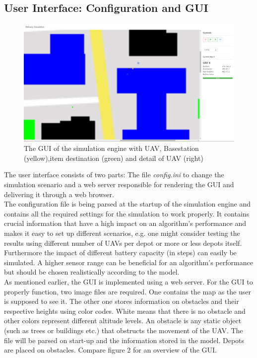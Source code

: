 \subsection{User Interface: Configuration and GUI}
\begin{figure}[htbp]\label{fig:gui}
	\centering
	\includegraphics[width=\textwidth]{images/gui}
	\caption{The GUI of the simulation engine with UAV, Basestation (yellow),item destination (green) and detail of UAV (right)}
\end{figure}
The user interface consists of two parts: The file \textit{config.ini} to change the simulation scenario and a web server responsible for rendering the GUI and delivering it through a web browser.\\
The configuration file is being parsed at the startup of the simulation engine and contains all the required settings for the simulation to work properly. It contains crucial information that have a high impact on an algorithm's performance and makes it easy to set up different scenarios, e.g. one might consider testing the results using different number of UAVs per depot or more or less depots itself.
Furthermore the impact of different battery capacity (in steps) can easily be simulated. A higher sensor range can be beneficial for an algorithm's performance but should be chosen realistically according to the model.\\
As mentioned earlier, the GUI is implemented using a web server. For the GUI to properly function, two image files are required. One contains the map as the user is supposed to see it. The other one stores information on obstacles and their respective heights using color codes. White means that there is no obstacle and other colors represent different altitude levels. An obstacle is any static object (such as trees or buildings etc.) that obstructs the movement of the UAV. The file will be parsed on start-up and the information stored in the model.  Depots are placed on obstacles. Compare figure 2 for an overview of the GUI.\\

